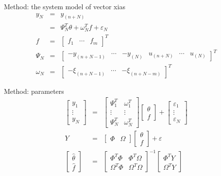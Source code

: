 \begin{frame}{ Method: the system model of vector xias }
\begin{eqnarray*}
y_{N} &=& y_{(n+N)} \\
&=& \Psi_N^T\theta + \omega_N^T f+\varepsilon_{N} \\
f &=&\begin{bmatrix} f_1 &\cdots & f_m\end{bmatrix}^T \\
\Psi_N &=&\begin{bmatrix}-y_{(n+N-1)} & \cdots & -y_{(N)} & u_{(n+N)} &\cdots & u_{(N)} \end{bmatrix}^T \\
\omega_N &=&\begin{bmatrix} -\xi_{(n+N-1)} & \cdots & -\xi_{(n+N-m)} \end{bmatrix}^T  
\end{eqnarray*}
\end{frame}

\begin{frame}{ Method:  parameters }
\begin{eqnarray*}
\begin{bmatrix} y_1 \\ \vdots \\ y_{N} \end{bmatrix}&=& 
\begin{bmatrix} \Psi_1^T & \omega_1^T  \\
\vdots & \vdots \\
\Psi_N^T & \omega_N^T
\end{bmatrix} \begin{bmatrix}\theta \\ f \end{bmatrix} + 
\begin{bmatrix} \varepsilon_1 \\ \vdots \\ \varepsilon_N \end{bmatrix}\\
Y &=& \begin{bmatrix} \Phi & \Omega \end{bmatrix} \begin{bmatrix}\theta \\ f \end{bmatrix} + \varepsilon \\
\begin{bmatrix}\hat\theta \\ \hat f \end{bmatrix} &=& \begin{bmatrix}\Phi^T\Phi & \Phi^T\Omega \\ \Omega^T\Phi & \Omega^T\Omega \end{bmatrix}^{-1}\begin{bmatrix}\Phi^T Y \\ \Omega^T Y\end{bmatrix}
\end{eqnarray*}
\end{frame}


